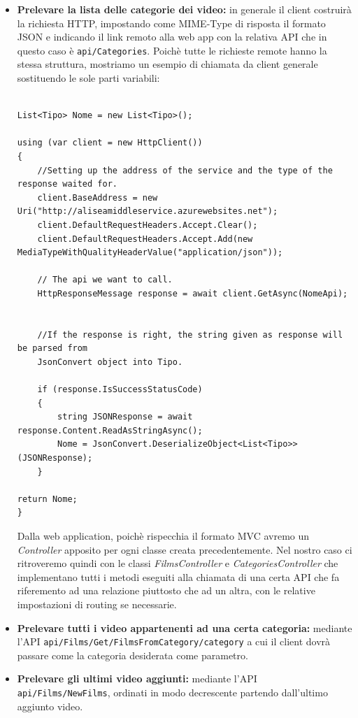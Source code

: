 \documentclass[a4]{book}
\begin{document}
\begin{itemize}
	\item \textbf{Prelevare la lista delle categorie dei video:} in generale il client costruirà la richiesta HTTP, impostando come MIME-Type di risposta il formato JSON e indicando il link remoto alla web app con la relativa API che in questo caso è \texttt{api/Categories}. Poichè tutte le richieste remote hanno la stessa struttura, mostriamo un esempio di chiamata da client generale sostituendo le sole parti variabili:
	
	\begin{lstlisting}
		
List<Tipo> Nome = new List<Tipo>();
	
using (var client = new HttpClient())
{
	//Setting up the address of the service and the type of the response waited for. 
	client.BaseAddress = new Uri("http://aliseamiddleservice.azurewebsites.net");
	client.DefaultRequestHeaders.Accept.Clear();
	client.DefaultRequestHeaders.Accept.Add(new MediaTypeWithQualityHeaderValue("application/json"));

	// The api we want to call.
	HttpResponseMessage response = await client.GetAsync(NomeApi);


	//If the response is right, the string given as response will be parsed from
	JsonConvert object into Tipo.
	
	if (response.IsSuccessStatusCode)
	{
		string JSONResponse = await response.Content.ReadAsStringAsync();
		Nome = JsonConvert.DeserializeObject<List<Tipo>>(JSONResponse);
	}

return Nome;
}
	\end{lstlisting}
	
	Dalla web application, poichè rispecchia il formato MVC avremo un \textit{Controller} apposito per ogni classe creata precedentemente. Nel nostro caso ci ritroveremo quindi con le classi \textit{FilmsController} e \textit{CategoriesController} che implementano tutti i metodi eseguiti alla chiamata di una certa API che fa riferemento ad una relazione piuttosto che ad un altra, con le relative impostazioni di routing se necessarie. 

	\item \textbf{Prelevare tutti i video appartenenti ad una certa categoria:} mediante l'API \texttt{api/Films/Get/FilmsFromCategory/{category}} a cui il client dovrà passare come la categoria desiderata come parametro.
	
	\item \textbf{Prelevare gli ultimi video aggiunti:} mediante l'API \texttt{api/Films/NewFilms}, ordinati in modo decrescente partendo dall'ultimo aggiunto video.
	

\end{itemize}
\end{document}
